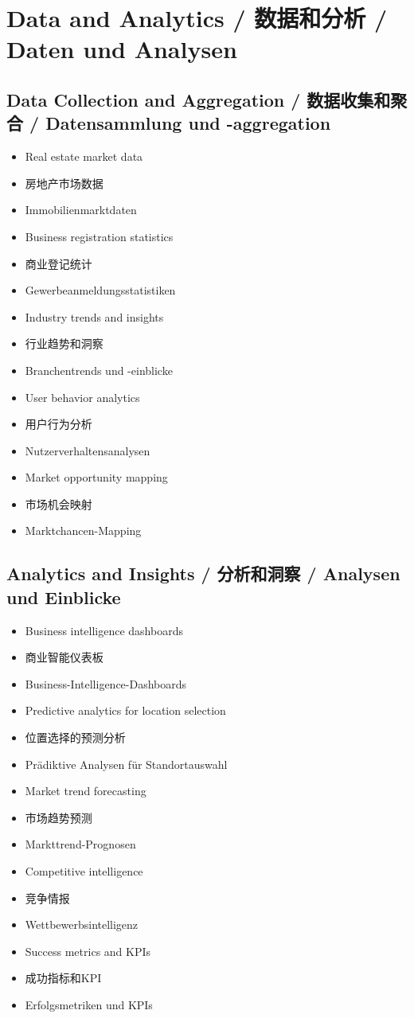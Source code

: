 \section{Data and Analytics / 数据和分析 / Daten und Analysen}

\subsection{Data Collection and Aggregation / 数据收集和聚合 / Datensammlung und -aggregation}
\begin{itemize}
    \item Real estate market data
    \item 房地产市场数据
    \item Immobilienmarktdaten
    \item Business registration statistics
    \item 商业登记统计
    \item Gewerbeanmeldungsstatistiken
    \item Industry trends and insights
    \item 行业趋势和洞察
    \item Branchentrends und -einblicke
    \item User behavior analytics
    \item 用户行为分析
    \item Nutzerverhaltensanalysen
    \item Market opportunity mapping
    \item 市场机会映射
    \item Marktchancen-Mapping
\end{itemize}

\subsection{Analytics and Insights / 分析和洞察 / Analysen und Einblicke}
\begin{itemize}
    \item Business intelligence dashboards
    \item 商业智能仪表板
    \item Business-Intelligence-Dashboards
    \item Predictive analytics for location selection
    \item 位置选择的预测分析
    \item Prädiktive Analysen für Standortauswahl
    \item Market trend forecasting
    \item 市场趋势预测
    \item Markttrend-Prognosen
    \item Competitive intelligence
    \item 竞争情报
    \item Wettbewerbsintelligenz
    \item Success metrics and KPIs
    \item 成功指标和KPI
    \item Erfolgsmetriken und KPIs
\end{itemize}

